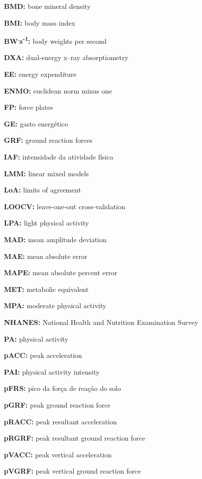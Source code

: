 \documentclass[12pt]{article}
\begin{document}
\noindent \textbf{BMD:} bone mineral density

\noindent \textbf{BMI:} body mass index

\noindent \textbf{BW\textsuperscript{.}s\textsuperscript{-1}:} body weights per second

\noindent \textbf{DXA:} dual-energy x–ray absorptiometry

\noindent \textbf{EE:} energy expenditure

\noindent \textbf{ENMO:} euclidean norm minus one

\noindent \textbf{FP:} force plates

\noindent \textbf{GE:} gasto energético

\noindent \textbf{GRF:} ground reaction forces

\noindent \textbf{IAF:} intensidade da atividade física

\noindent \textbf{LMM:} linear mixed models

\noindent \textbf{LoA:} limits of agreement

\noindent \textbf{LOOCV:} leave-one-out cross-validation

\noindent \textbf{LPA:} light physical activity

\noindent \textbf{MAD:} mean amplitude deviation

\noindent \textbf{MAE:} mean absolute error

\noindent \textbf{MAPE:} mean absolute percent error

\noindent \textbf{MET:} metabolic equivalent

\noindent \textbf{MPA:} moderate physical activity

\noindent \textbf{NHANES:} National Health and Nutrition Examination Survey

\noindent \textbf{PA:} physical activity

\noindent \textbf{pACC:} peak acceleration

\noindent \textbf{PAI:} physical activity intensity

\noindent \textbf{pFRS:} pico da força de reação do solo

\noindent \textbf{pGRF:} peak ground reaction force

\noindent \textbf{pRACC:} peak resultant acceleration

\noindent \textbf{pRGRF:} peak resultant ground reaction force

\noindent \textbf{pVACC:} peak vertical acceleration

\noindent \textbf{pVGRF:} peak vertical ground reaction force
\end{document}
